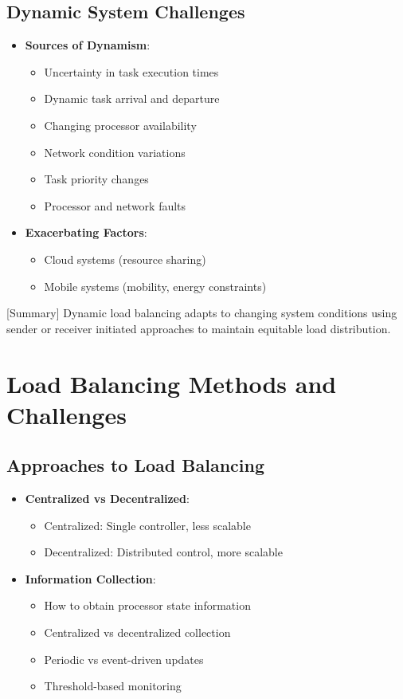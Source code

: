 \documentclass[12pt]{article}
\begin{document}
\subsection{Dynamic System Challenges}
\begin{itemize}
\item \textbf{Sources of Dynamism}:
  \begin{itemize}
  \item Uncertainty in task execution times
  \item Dynamic task arrival and departure
  \item Changing processor availability
  \item Network condition variations
  \item Task priority changes
  \item Processor and network faults
  \end{itemize}
  
\item \textbf{Exacerbating Factors}:
  \begin{itemize}
  \item Cloud systems (resource sharing)
  \item Mobile systems (mobility, energy constraints)
  \end{itemize}
\end{itemize}

[Summary] Dynamic load balancing adapts to changing system conditions using sender or receiver initiated approaches to maintain equitable load distribution.

\section{Load Balancing Methods and Challenges}

\subsection{Approaches to Load Balancing}
\begin{itemize}
\item \textbf{Centralized vs Decentralized}:
  \begin{itemize}
  \item Centralized: Single controller, less scalable
  \item Decentralized: Distributed control, more scalable
  \end{itemize}
  
\item \textbf{Information Collection}:
  \begin{itemize}
  \item How to obtain processor state information
  \item Centralized vs decentralized collection
  \item Periodic vs event-driven updates
  \item Threshold-based monitoring
  \end{itemize}
\end{itemize}
\end{document}
